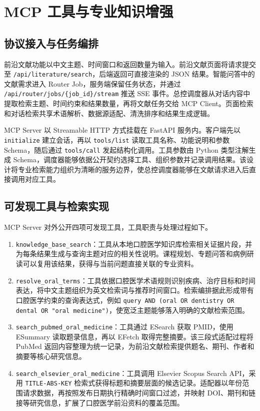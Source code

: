 \section{MCP 工具与专业知识增强}
\label{sec:mcp-knowledge-tools}

\subsection{协议接入与任务编排}

前沿文献功能以中文主题、时间窗口和返回数量为输入。前沿文献页面将请求提交至 \texttt{/api/literature/search}，后端返回可直接渲染的 JSON 结果。智能问答中的文献需求进入 Router Job，服务端保留任务状态，并通过 \texttt{/api/router/jobs/\{job\_id\}/stream} 推送 SSE 事件。总控调度器从对话内容中提取检索主题、时间约束和结果数量，再将文献任务交给 MCP Client。页面检索和对话检索共享术语解析、数据源适配、清洗排序和结果生成逻辑。

MCP Server 以 Streamable HTTP 方式挂载在 FastAPI 服务内。客户端先以 \texttt{initialize} 建立会话，再以 \texttt{tools/list} 读取工具名称、功能说明和参数 Schema，随后通过 \texttt{tools/call} 发起结构化调用。工具参数由 Python 类型注解生成 Schema，调度器能够依据公开契约选择工具、组织参数并记录调用结果。该设计将专业检索能力组织为清晰的服务边界，使总控调度器能够在文献请求进入后直接调用对应工具。

\subsection{可发现工具与检索实现}

MCP Server 对外公开四项可发现工具，工具职责与处理过程如下。

\begin{enumerate}
  \item \texttt{knowledge\_base\_search}：工具从本地口腔医学知识库检索相关证据片段，并为每条结果生成与查询主题对应的相关性说明。课程规划、专题问答和病例研读可以复用该结果，获得与当前问题直接关联的专业资料。
  \item \texttt{resolve\_oral\_terms}：工具依据口腔医学术语规则识别疾病、治疗目标和时间表达，将中文主题组织为英文检索词与推荐时间窗口。检索编排据此形成带有口腔医学约束的查询表达式，例如 \texttt{query AND (oral OR dentistry OR dental OR "oral medicine")}，使宽泛主题能够落入明确的文献检索范围。
  \item \texttt{search\_pubmed\_oral\_medicine}：工具通过 ESearch 获取 PMID，使用 ESummary 读取题录信息，再以 EFetch 取得完整摘要。该三段式适配过程将 PubMed 返回内容整理为统一记录，为前沿文献检索提供题名、期刊、作者和摘要等核心研究信息。
  \item \texttt{search\_elsevier\_oral\_medicine}：工具调用 Elsevier Scopus Search API，采用 \texttt{TITLE-ABS-KEY} 检索式获得标题和摘要层面的候选记录。适配器以年份范围请求数据，再按照发布日期执行精确时间窗口过滤，并映射 DOI、期刊和链接等研究信息，扩展了口腔医学前沿资料的覆盖范围。
\end{enumerate}

